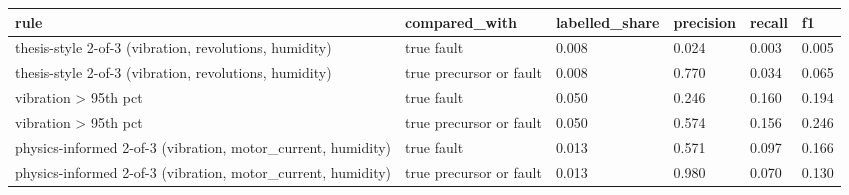 \begin{tabular}{llllll}
\toprule
rule & compared\_with & labelled\_share & precision & recall & f1 \\
\midrule
thesis-style 2-of-3 (vibration, revolutions, humidity) & true fault & 0.008 & 0.024 & 0.003 & 0.005 \\
thesis-style 2-of-3 (vibration, revolutions, humidity) & true precursor or fault & 0.008 & 0.770 & 0.034 & 0.065 \\
vibration > 95th pct & true fault & 0.050 & 0.246 & 0.160 & 0.194 \\
vibration > 95th pct & true precursor or fault & 0.050 & 0.574 & 0.156 & 0.246 \\
physics-informed 2-of-3 (vibration, motor\_current, humidity) & true fault & 0.013 & 0.571 & 0.097 & 0.166 \\
physics-informed 2-of-3 (vibration, motor\_current, humidity) & true precursor or fault & 0.013 & 0.980 & 0.070 & 0.130 \\
\bottomrule
\end{tabular}
